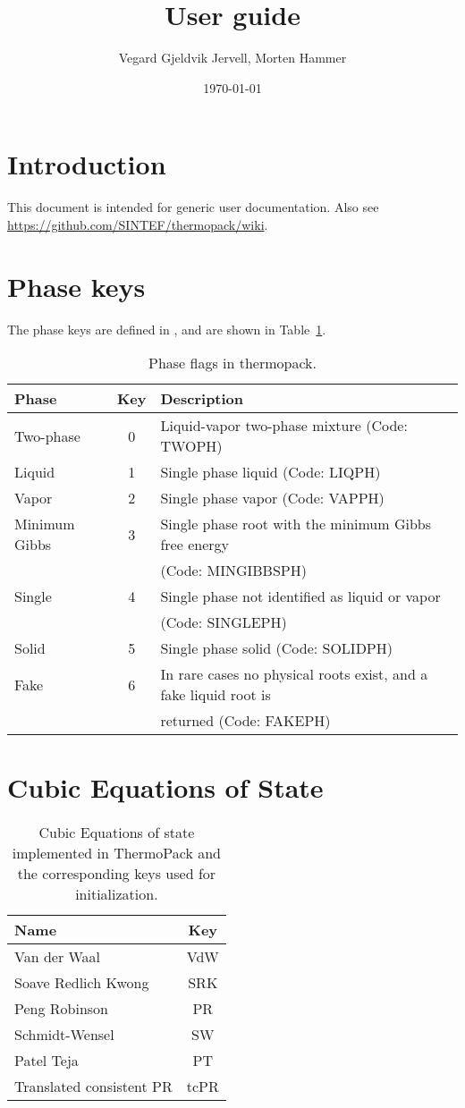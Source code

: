 \documentclass[english]{thermomemo}
\title{User guide}
\author{Vegard Gjeldvik Jervell, Morten Hammer}
\date{\today}
\begin{document}
\frontmatter
\tableofcontents

\section{Introduction}
This document is intended for generic user documentation. Also see
\url{https://github.com/SINTEF/thermopack/wiki}.

\section{Phase keys}
The phase keys are defined in ,
and are shown in Table~\ref{tab:phase_flags_thermopack}.
\begin{table}[ht!]
  \centering
  \begin{tabular}{l c l}
    \toprule
    Phase & Key & Description\\
    \midrule
    Two-phase & 0 & Liquid-vapor two-phase mixture (Code: TWOPH)\\
    Liquid & 1 & Single phase liquid (Code: LIQPH) \\
    Vapor & 2 & Single phase vapor (Code: VAPPH) \\
    Minimum Gibbs & 3 & Single phase root with the minimum Gibbs free energy \\ & & (Code: MINGIBBSPH) \\
    Single & 4 & Single phase not identified as liquid or vapor \\ & & (Code: SINGLEPH) \\
    Solid & 5 & Single phase solid (Code: SOLIDPH) \\
    Fake & 6 & In rare cases no physical roots exist, and a fake liquid root is \\ & & returned (Code: FAKEPH) \\
    \bottomrule
  \end{tabular}
  \caption{Phase flags in thermopack.}
  \label{tab:phase_flags_thermopack}
\end{table}

\section{Cubic Equations of State}

\begin{table}[ht!]
  \centering
  \begin{tabular}{l c }
    \toprule
    Name & Key \\
    \midrule
    Van der Waal & VdW\\
    Soave Redlich Kwong & SRK\\
    Peng Robinson & PR\\
    Schmidt-Wensel & SW\\
    Patel Teja & PT\\
    Translated consistent PR & tcPR\\
    \bottomrule
  \end{tabular}
  \caption{Cubic Equations of state implemented in ThermoPack and the corresponding keys used for initialization.}
  \label{tab:EoS_thermopack}
\end{table}
\end{document}
